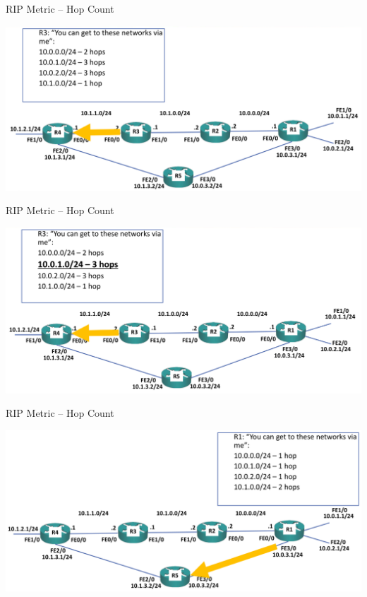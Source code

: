 \documentclass[pdflatex,compress,mathserif]{beamer}
\begin{document}
\begin{frame}{RIP Metric – Hop Count}
	\begin{center}
		\includegraphics[width=\linewidth]{img/img12}
	\end{center}
\end{frame}

\begin{frame}{RIP Metric – Hop Count}
	\begin{center}
		\includegraphics[width=\linewidth]{img/img13}
	\end{center}
\end{frame}

\begin{frame}{RIP Metric – Hop Count}
	\begin{center}
		\includegraphics[width=\linewidth]{img/img14}
	\end{center}
\end{frame}
\end{document}
